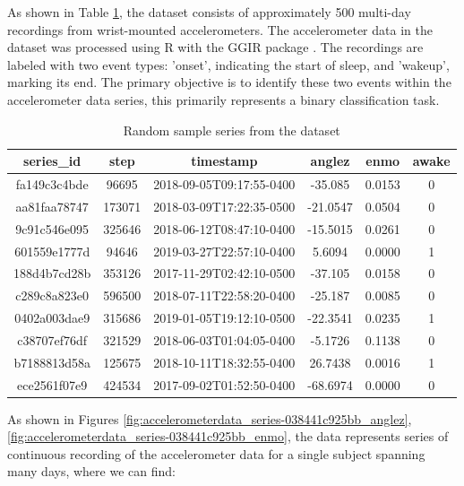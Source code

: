 \documentclass{article}
\begin{document}
 As shown in Table \ref{fig:accelerometerdata_dataframe}, the dataset consists of approximately 500 multi-day recordings from wrist-mounted accelerometers. The accelerometer data in the dataset was processed using R with the GGIR package \cite{Migueles2019GGIR}. The recordings are labeled with two event types: 'onset', indicating the start of sleep, and 'wakeup', marking its end. The primary objective is to identify these two events within the accelerometer data series, this primarily represents a binary classification task. 

  \begin{table}[ht]
    \centering
    \caption{Random sample series from the dataset}
    \begin{tabular}{|c|c|c|c|c|c|}
        \hline
        \textbf{series\_id} & \textbf{step} & \textbf{timestamp} & \textbf{anglez} & \textbf{enmo} & \textbf{awake} \\
        \hline
        fa149c3c4bde & 96695 & 2018-09-05T09:17:55-0400 & -35.085 & 0.0153 & 0 \\
        aa81faa78747 & 173071 & 2018-03-09T17:22:35-0500 & -21.0547 & 0.0504 & 0 \\
        9c91c546e095 & 325646 & 2018-06-12T08:47:10-0400 & -15.5015 & 0.0261 & 0 \\
        601559e1777d & 94646 & 2019-03-27T22:57:10-0400 & 5.6094 & 0.0000 & 1 \\
        188d4b7cd28b & 353126 & 2017-11-29T02:42:10-0500 & -37.105 & 0.0158 & 0 \\
        c289c8a823e0 & 596500 & 2018-07-11T22:58:20-0400 & -25.187 & 0.0085 & 0 \\
        0402a003dae9 & 315686 & 2019-01-05T19:12:10-0500 & -22.3541 & 0.0235 & 1 \\
        c38707ef76df & 321529 & 2018-06-03T01:04:05-0400 & -5.1726 & 0.1138 & 0 \\
        b7188813d58a & 125675 & 2018-10-11T18:32:55-0400 & 26.7438 & 0.0016 & 1 \\
        ece2561f07e9 & 424534 & 2017-09-02T01:52:50-0400 & -68.6974 & 0.0000 & 0 \\
        \hline
    \end{tabular}
    \label{fig:accelerometerdata_dataframe}
\end{table}

As shown in Figures \ref{fig:accelerometerdata_series-038441c925bb_anglez}, \ref{fig:accelerometerdata_series-038441c925bb_enmo}, the data represents series of continuous recording of the accelerometer data for a single subject spanning many days, where we can find:
\end{document}
